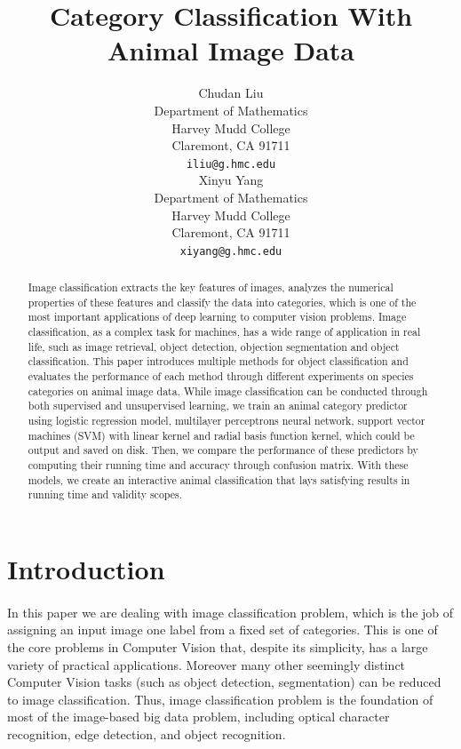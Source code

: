 \documentclass{article}
\title{Category Classification With Animal Image Data}
\author{
 Chudan Liu\\
 Department of Mathematics\\
 Harvey Mudd College\\
 Claremont, CA 91711 \\
 \texttt{iliu@g.hmc.edu} \\
  \And
  Xinyu Yang \\
  Department of Mathematics\\
  Harvey Mudd College \\
  Claremont, CA 91711 \\
  \texttt{xiyang@g.hmc.edu} \\
}
\begin{document}

\maketitle

\begin{abstract}
 
Image classification extracts the key features of images, analyzes the numerical properties of these features and classify the data into categories, which is one of the most important applications of deep learning to computer vision problems. Image classification, as a complex task for machines, has a wide range of application in real life, such as image retrieval, object detection, objection segmentation and object classification. This paper introduces multiple methods for object classification and evaluates the performance of each method through different experiments on species categories on animal image data. While image classification can be conducted through both supervised and unsupervised learning, we train an animal category predictor using logistic regression model, multilayer perceptrons neural network, support vector machines (SVM) with linear kernel and radial basis function kernel, which could be output and saved on disk. Then, we compare the performance of these predictors by computing their running time and accuracy through confusion matrix. With these models, we create an interactive animal classification that lays satisfying results in running time and validity scopes. 
\end{abstract}

\section{Introduction}
\paragraph{}
In this paper we are dealing with image classification problem, which is the job of assigning an input image one label from a fixed set of categories. This is one of the core problems in Computer Vision that, despite its simplicity, has a large variety of practical applications. Moreover many other seemingly distinct Computer Vision tasks (such as object detection, segmentation) can be reduced to image classification. Thus, image classification problem is the foundation of most of the image-based big data problem, including optical character recognition, edge detection, and object recognition.
\end{document}
